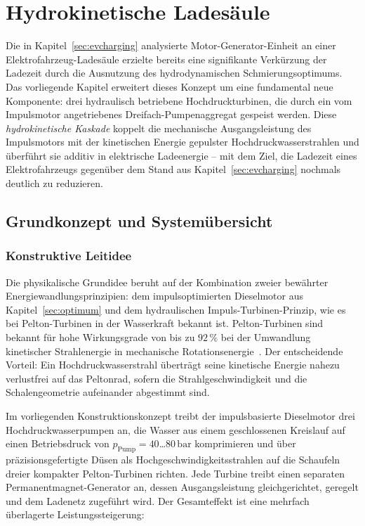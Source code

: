 ﻿\documentclass[a4paper,12pt]{article}
\begin{document}
\section{Hydrokinetische Ladesäule}
\label{sec:hydroladestation}

Die in Kapitel~\ref{sec:evcharging} analysierte Motor-Generator-Einheit an
einer Elektrofahrzeug-Ladesäule erzielte bereits eine signifikante Verkürzung
der Ladezeit durch die Ausnutzung des hydrodynamischen Schmierungsoptimums.
Das vorliegende Kapitel erweitert dieses Konzept um eine fundamental neue
Komponente: drei hydraulisch betriebene Hochdruckturbinen, die durch ein vom
Impulsmotor angetriebenes Dreifach-Pumpenaggregat gespeist werden. Diese
\textit{hydrokinetische Kaskade} koppelt die mechanische Ausgangsleistung des
Impulsmotors mit der kinetischen Energie gepulster Hochdruckwasserstrahlen
und überführt sie additiv in elektrische Ladeenergie -- mit dem Ziel, die
Ladezeit eines Elektrofahrzeugs gegenüber dem Stand aus Kapitel~\ref{sec:evcharging}
nochmals deutlich zu reduzieren.

\subsection{Grundkonzept und Systemübersicht}

\subsubsection{Konstruktive Leitidee}

Die physikalische Grundidee beruht auf der Kombination zweier bewährter
Energiewandlungsprinzipien: dem impulsoptimierten Dieselmotor aus
Kapitel~\ref{sec:optimum} und dem hydraulischen Impuls-Turbinen-Prinzip,
wie es bei Pelton-Turbinen in der Wasserkraft bekannt ist. Pelton-Turbinen
sind bekannt für hohe Wirkungsgrade von bis zu $92\,\%$ bei der Umwandlung
kinetischer Strahlenergie in mechanische Rotationsenergie~\cite{mollenhauer2007}.
Der entscheidende Vorteil: Ein Hochdruckwasserstrahl überträgt seine kinetische
Energie nahezu verlustfrei auf das Peltonrad, sofern die Strahlgeschwindigkeit
und die Schalengeometrie aufeinander abgestimmt sind.

Im vorliegenden Konstruktionskonzept treibt der impulsbasierte Dieselmotor
drei Hochdruckwasserpumpen an, die Wasser aus einem geschlossenen Kreislauf
auf einen Betriebsdruck von $p_\text{Pump} = 40$\ldots$80\,\text{bar}$
komprimieren und über präzisionsgefertigte Düsen als Hochgeschwindigkeitsstrahlen
auf die Schaufeln dreier kompakter Pelton-Turbinen richten. Jede Turbine treibt
einen separaten Permanentmagnet-Generator an, dessen Ausgangsleistung gleichgerichtet,
geregelt und dem Ladenetz zugeführt wird. Der Gesamteffekt ist eine mehrfach
überlagerte Leistungssteigerung:
\end{document}
